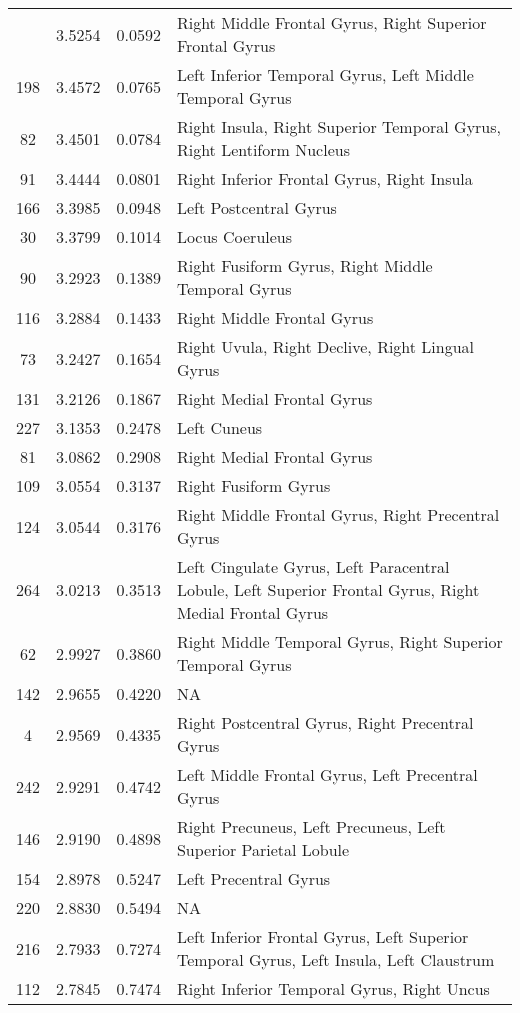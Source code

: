 \documentclass[10pt,letterpaper]{article}\usepackage[]{graphicx}\usepackage[]{color}
\begin{document}
\begin{center}
\begin{longtable}[c]{cccp{4in}}
		\bottomrule
		\endlastfoot
		64	& 3.5254 & 0.0592 & Right Middle Frontal Gyrus, Right Superior Frontal Gyrus \\
		198	& 3.4572 & 0.0765 & Left Inferior Temporal Gyrus, Left Middle Temporal Gyrus \\
		82	& 3.4501 & 0.0784 & Right Insula, Right Superior Temporal Gyrus, Right Lentiform Nucleus \\
		91	& 3.4444 & 0.0801 & Right Inferior Frontal Gyrus, Right Insula \\
		166	& 3.3985 & 0.0948 & Left Postcentral Gyrus \\
		30	& 3.3799 & 0.1014 & Locus Coeruleus \\
		90	& 3.2923 & 0.1389 & Right Fusiform Gyrus, Right Middle Temporal Gyrus \\
		116	& 3.2884 & 0.1433 & Right Middle Frontal Gyrus \\
		73	& 3.2427 & 0.1654 & Right Uvula, Right Declive, Right Lingual Gyrus \\
		131	& 3.2126 & 0.1867 & Right Medial Frontal Gyrus \\
		227	& 3.1353 & 0.2478 & Left Cuneus \\
		81	& 3.0862 & 0.2908 & Right Medial Frontal Gyrus \\
		109	& 3.0554 & 0.3137 & Right Fusiform Gyrus \\
		124	& 3.0544 & 0.3176 & Right Middle Frontal Gyrus, Right Precentral Gyrus \\
		264	& 3.0213 & 0.3513 & Left Cingulate Gyrus, Left Paracentral Lobule, Left Superior Frontal Gyrus, Right Medial Frontal Gyrus\\
		62	& 2.9927 & 0.3860 & Right Middle Temporal Gyrus, Right Superior Temporal Gyrus \\
		142	& 2.9655 & 0.4220 & NA \\
		4	& 2.9569 & 0.4335 & Right Postcentral Gyrus, Right Precentral Gyrus \\
		242	& 2.9291 & 0.4742 & Left Middle Frontal Gyrus, Left Precentral Gyrus \\
		146	& 2.9190 & 0.4898 & Right Precuneus, Left Precuneus, Left Superior Parietal Lobule \\
		154	& 2.8978 & 0.5247 & Left Precentral Gyrus \\
		220	& 2.8830 & 0.5494 & NA \\
		216	& 2.7933 & 0.7274 & Left Inferior Frontal Gyrus, Left Superior Temporal Gyrus, Left Insula, Left Claustrum \\
		112	& 2.7845 & 0.7474 & Right Inferior Temporal Gyrus, Right Uncus \\

\end{longtable}
\end{center}
\end{document}
